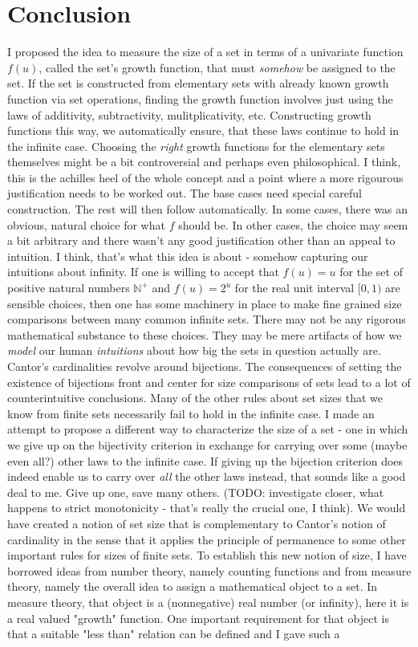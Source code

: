 \documentclass[12pt]{article}
\begin{document}
\section{Conclusion}
I proposed the idea to measure the size of a set in terms of a univariate function $f(u)$, called the set's growth function, that must \emph{somehow} be assigned to the set. If the set is constructed from elementary sets with already known growth function via set operations, finding the growth function involves just using the laws of additivity, subtractivity, mulitplicativity, etc. Constructing growth functions this way, we automatically ensure, that these laws continue to hold in the infinite case. Choosing the \emph{right} growth functions for the elementary sets themselves might be a bit controversial and perhaps even philosophical. I think, this is the achilles heel of the whole concept and a point where a more rigourous justification needs to be worked out. The base cases need special careful construction. The rest will then follow automatically. In some cases, there was an obvious, natural choice for what $f$ should be. In other cases, the choice may seem a bit arbitrary and there wasn't any good justification other than an appeal to intuition. I think, that's what this idea is about - somehow capturing our intuitions about infinity. If one is willing to accept that $f(u) = u$ for the set of positive natural numbers $\mathbb{N}^+$ and $f(u) = 2^u$ for the real unit interval $[0,1)$ are sensible choices, then one has some machinery in place to make fine grained size comparisons between many common infinite sets. There may not be any rigorous mathematical substance to these choices. They may be mere artifacts of how we \emph{model} our human \emph{intuitions} about how big the sets in question actually are. Cantor's cardinalities revolve around bijections. The consequences of setting the existence of bijections front and center for size comparisons of sets lead to a lot of counterintuitive conclusions. Many of the other rules about set sizes that we know from finite sets necessarily fail to hold in the infinite case. I made an attempt to propose a different way to characterize the size of a set - one in which we give up on the bijectivity criterion in exchange for carrying over some (maybe even all?) other laws to the infinite case. If giving up the bijection criterion does indeed enable us to carry over \emph{all} the other laws instead, that sounds like a good deal to me. Give up one, save many others. (TODO: investigate closer, what happens to strict monotonicity - that's really the crucial one, I think). We would have created a notion of set size that is complementary to Cantor's notion of cardinality in the sense that it applies the principle of permanence to some other important rules for sizes of finite sets. To establish this new notion of size, I have borrowed ideas from number theory, namely counting functions and from measure theory, namely the overall idea to assign a mathematical object to a set. In measure theory, that object is a (nonnegative) real number (or infinity), here it is a real valued "growth" function. One important requirement for that object is that a suitable "less than" relation can be defined and I gave such a 
\end{document}
